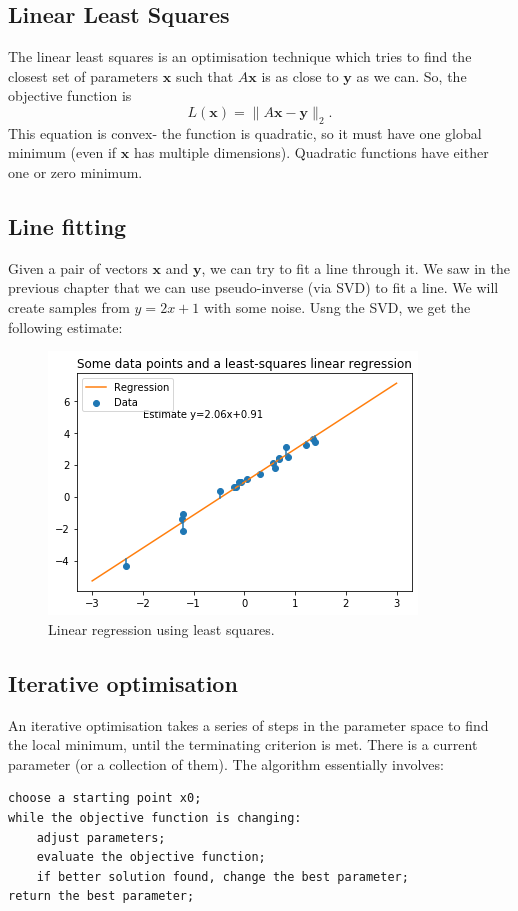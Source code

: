 \documentclass[a4paper, openany]{memoir}
\begin{document}
\subsection{Linear Least Squares}
The linear least squares is an optimisation technique which tries to find the closest set of parameters $\mathbf{x}$ such that $A \mathbf{x}$ is as close to $\mathbf{y}$ as we can. So, the objective function is
\[L(\mathbf{x}) = \lVert A \mathbf{x} - \mathbf{y} \rVert_2.\]
This equation is convex- the function is quadratic, so it must have one global minimum (even if $\mathbf{x}$ has multiple dimensions). Quadratic functions have either one or zero minimum.

\subsection{Line fitting}
Given a pair of vectors $\mathbf{x}$ and $\mathbf{y}$, we can try to fit a line through it. We saw in the previous chapter that we can use pseudo-inverse (via SVD) to fit a line. We will create samples from $y = 2x + 1$ with some noise. Usng the SVD, we get the following estimate:
\begin{figure}[H]
    \centering
    \includegraphics[scale=0.6]{src/4.11 linear regression least squares.png}
    \caption{Linear regression using least squares.}
\end{figure}

\subsection{Iterative optimisation}
An iterative optimisation takes a series of steps in the parameter space to find the local minimum, until the terminating criterion is met. There is a current parameter (or a collection of them). The algorithm essentially involves:
\begin{verbatim}
choose a starting point x0;
while the objective function is changing:
    adjust parameters;
    evaluate the objective function;
    if better solution found, change the best parameter;
return the best parameter;
\end{verbatim}
\end{document}
